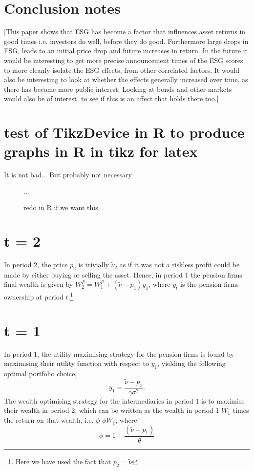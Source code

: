 \documentclass[11pt]{article}
\newcommand\fnote[1]{\captionsetup{font=small}\caption*{#1}}
\begin{document}
\begin{appendices}
\section{Conclusion notes}
[This paper shows that ESG has become a factor that influences asset returns in good times i.e. investors do well, before they do good. Furthermore large drops in ESG, leads to an initial price drop and future increases in return. In the future it would be interesting to get more precise announcement times of the ESG scores to more cleanly isolate the ESG effects, from other correlated factors. It would also be interesting to look at whether the effects generally increased over time, as there has become more public interest. Looking at bonds and other markets would also be of interest, to see if this is an affect that holds there too.]


\section{test of TikzDevice in R to produce graphs in R in tikz for latex}
It is not bad... But probably not necessary
\begin{figure}%
	\centering
	\caption{redo in R if we want this}
	\fnote{...}
\end{figure}


\section*{t = 2}

In period 2, the price $p_2$ is trivially $\tilde{\nu}_2$ as if it was not a riskless profit could be made by either buying or selling the asset. Hence, in period 1 the pension firms final wealth is given by $W_2^P = W_1^P + (\tilde{\nu} - p_1)y_1$, where $y_t$ is the pension firms ownership at period $t$.\footnote{Here we have used the fact that $p_2 = \tilde{\nu}$}

\section*{t = 1}

In period 1, the utility maximising strategy for the pension firms is found by maximising their utility function with respect to $y_1$, yielding the following optimal portfolio choice,
\begin{equation}
y_1 = \frac{\tilde{\nu} - p_1}{\gamma \sigma^2}.
\end{equation}
The wealth optimising strategy for the intermediaries in period 1 is to maximise their wealth in period 2, which can be written as the wealth in period 1 $W_1$ times the return on that wealth, i.e. $\phi$ $\phi W_1$, where
\begin{equation}
\phi = 1 + \frac{(\tilde{\nu} - p_1)}{\theta}
\end{equation}


\end{appendices}
\end{document}
